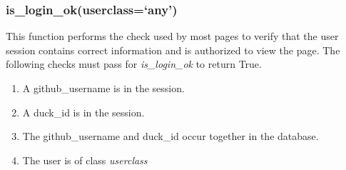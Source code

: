 \subsubsection{is\_login\_ok(userclass=`any')}
This function performs the check used by most pages to verify that the user session contains correct information and is authorized to view the page. The following checks must pass for \emph{is\_login\_ok} to return True.
\begin{enumerate}
\item A github\_username is in the session.
\item A duck\_id is in the session.
\item The github\_username and duck\_id occur together in the database.
\item The user is of class \emph{userclass}
\end{enumerate}